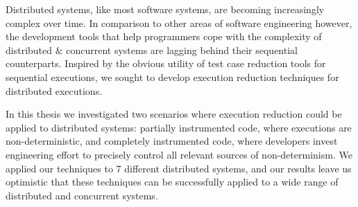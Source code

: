 Distributed systems, like most software systems, are becoming increasingly complex over time.
In comparison to other areas of software engineering however, the development
tools that help programmers cope with the complexity of distributed \&
concurrent systems are lagging behind their sequential counterparts.
Inspired by the obvious utility of test case reduction tools for sequential
executions, we sought to develop
execution reduction techniques for distributed executions.

In this thesis we investigated two scenarios where execution reduction could be applied to
distributed systems: partially instrumented code, where executions are non-deterministic, and
completely instrumented code, where developers invest engineering effort
to precisely control all relevant sources of non-determinism. We applied our
techniques to 7 different distributed systems, and our results
leave us optimistic that these techniques can be
successfully applied to a wide range of distributed and concurrent systems.




